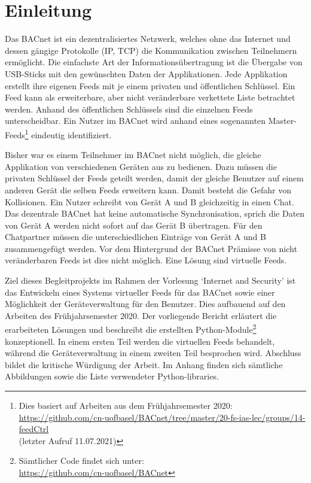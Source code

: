 \documentclass[a4paper,titlepage]{article}
\begin{document}
\section{Einleitung}

Das BACnet ist ein dezentralisiertes Netzwerk, welches ohne das Internet und dessen gängige Protokolle (IP, TCP) die Kommunikation zwischen Teilnehmern ermöglicht. Die einfachste Art der Informationsübertragung ist die Übergabe von USB-Sticks mit den gewünschten Daten der Applikationen. Jede Applikation erstellt ihre eigenen Feeds mit je einem privaten und öffentlichen Schlüssel. Ein Feed kann als erweiterbare, aber nicht veränderbare verkettete Liste betrachtet werden. Anhand des öffentlichen Schlüssels sind die einzelnen Feeds unterscheidbar. Ein Nutzer im BACnet wird anhand eines sogenannten Master-Feeds\footnote{Dies basiert auf Arbeiten aus dem Frühjahrsemester 2020: \\ \url{https://github.com/cn-uofbasel/BACnet/tree/master/20-fs-ias-lec/groups/14-feedCtrl} \\ (letzter Aufruf 11.07.2021)} eindeutig identifiziert.

Bisher war es einem Teilnehmer im BACnet nicht möglich, die gleiche Applikation von verschiedenen Geräten aus zu bedienen. Dazu müssen die privaten Schlüssel der Feeds geteilt werden, damit der gleiche Benutzer auf einem anderen Gerät die selben Feeds erweitern kann. Damit besteht die Gefahr von Kollisionen. Ein Nutzer schreibt von Gerät A und B gleichzeitig in einen Chat. Das dezentrale BACnet hat keine automatische Synchronisation, sprich die Daten von Gerät A werden nicht sofort auf das Gerät B übertragen. Für den Chatpartner müssen die unterschiedlichen Einträge von Gerät A und B zusammengefügt werden. Vor dem Hintergrund der BACnet Prämisse von nicht veränderbaren Feeds ist dies nicht möglich. Eine Lösung sind virtuelle Feeds.

Ziel dieses Begleitprojekts im Rahmen der Vorlesung `Internet and Security' ist das Entwickeln eines Systems virtueller Feeds für das BACnet sowie einer Möglichkeit der Geräteverwaltung für den Benutzer. Dies aufbauend auf den Arbeiten des Frühjahrsemester 2020. Der vorliegende Bericht erläutert die erarbeiteten Lösungen und beschreibt die erstellten Python-Module\footnote{Sämtlicher Code findet sich unter: \\ \url{https://github.com/cn-uofbasel/BACnet}} konzeptionell. In einem ersten Teil werden die virtuellen Feeds behandelt, während die Geräteverwaltung in einem zweiten Teil besprochen wird. Abschluss bildet die kritische Würdigung der Arbeit. Im Anhang finden sich sämtliche Abbildungen sowie die Liste verwendeter Python-libraries.
\end{document}
